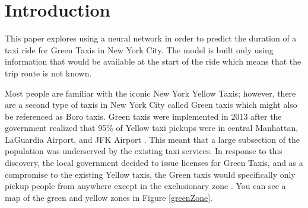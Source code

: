 \documentclass[conference]{IEEEtran}
\begin{document}


\section{Introduction}

This paper explores using a neural network in order to predict the duration of a taxi ride for Green Taxis in New York City.  The model is built only using information that would be available at the start of the ride which means that the trip route is not known.

Most people are familiar with the iconic New York Yellow Taxis;  however, there are a second type of taxis in New York City called Green taxis which might also be referenced as Boro taxis.  Green taxis were implemented in 2013 after the government realized that 95\% of Yellow taxi pickups were in central Manhattan, LaGuardia Airport, and JFK Airport \cite{boroBackground}.  This meant that a large subsection of the population was underserved by the existing taxi services.  In response to this discovery, the local government decided to issue licenses for Green Taxis, and as a compromise to the existing Yellow taxis, the Green taxis would specifically only pickup people from anywhere except in the exclusionary zone \cite{boroBackground}.  You can see a map of the green and yellow zones in Figure \ref{greenZone}. 
\end{document}
